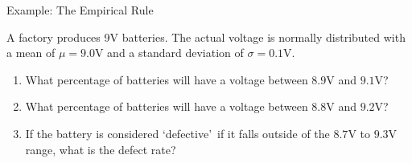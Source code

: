 \begin{frame}{Example: The Empirical Rule}
    \begin{example}
        A factory produces 9V batteries. The actual voltage is normally distributed with a mean of $\mu = 9.0\text{V}$ and a standard deviation of $\sigma = 0.1\text{V}$.
        
        \vspace{0.2cm}
        \begin{enumerate}
            \item What percentage of batteries will have a voltage between $8.9\text{V}$ and $9.1\text{V}$?
            \item What percentage of batteries will have a voltage between $8.8\text{V}$ and $9.2\text{V}$?
            \item If the battery is considered \lq defective\rq\ if it falls outside of the $8.7\text{V}$ to $9.3\text{V}$ range, what is the defect rate?
        \end{enumerate}
    \end{example}

\end{frame}

